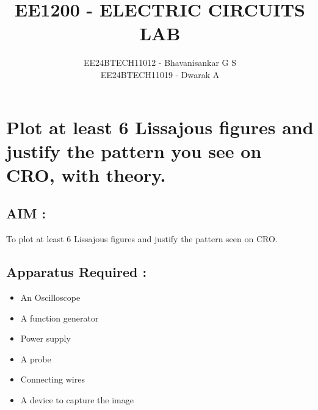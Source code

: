 \documentclass[report]{IEEEtran}
\begin{document}

\vspace{3cm}

\title{EE1200 - ELECTRIC CIRCUITS LAB }
\author{EE24BTECH11012 - Bhavanisankar G S \\ EE24BTECH11019 - Dwarak A}
{\let\newpage\relax\maketitle}

\renewcommand{\thefigure}{\theenumi}
\renewcommand{\thetable}{\theenumi}
\setlength{\intextsep}{10pt} %
\section{Plot at least 6 Lissajous figures and justify the pattern you see on CRO, with theory.}

\subsection{AIM : }
To plot at least 6 Lissajous figures and justify the pattern seen on CRO.

\subsection{Apparatus Required : }
\begin{itemize}
    \item An Oscilloscope
    \item A function generator
    \item Power supply
    \item A probe
    \item Connecting wires
    \item A device to capture the image
\end{itemize}
\end{document}
